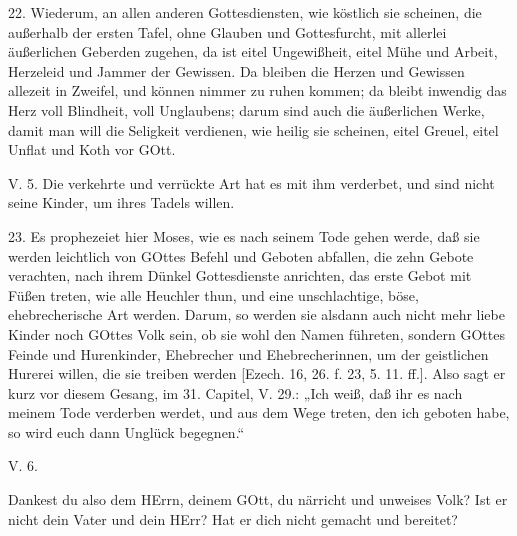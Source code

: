 22. Wiederum, an allen anderen Gottesdiensten, wie köstlich sie scheinen, die außerhalb der ersten Tafel, ohne Glauben und Gottesfurcht, mit allerlei äußerlichen Geberden zugehen, da ist eitel Ungewißheit, eitel Mühe und Arbeit, Herzeleid und Jammer der Gewissen. Da bleiben die Herzen und Gewissen allezeit in Zweifel, und können nimmer zu ruhen kommen; da bleibt inwendig das Herz voll Blindheit, voll Unglaubens; darum sind auch die äußerlichen Werke, damit man will die Seligkeit verdienen, wie heilig sie scheinen, eitel Greuel, eitel Unflat und Koth vor GOtt.

\begin{schriftzitat}
V. 5. Die verkehrte und verrückte Art hat es mit ihm verderbet, und sind nicht seine Kinder, um ihres Tadels willen.
\end{schriftzitat}

23. Es prophezeiet hier Moses, wie es nach seinem Tode gehen werde, daß sie werden leichtlich von GOttes Befehl und Geboten abfallen, die zehn Gebote verachten, nach ihrem Dünkel Gottesdienste anrichten, das erste Gebot mit Füßen treten, wie alle Heuchler thun, und eine unschlachtige, böse, ehebrecherische Art werden. Darum, so werden sie alsdann auch nicht mehr liebe Kinder noch GOttes Volk sein, ob sie wohl den Namen führeten, sondern GOttes Feinde und Hurenkinder, Ehebrecher und Ehebrecherinnen, um der geistlichen Hurerei willen, die sie treiben werden [Ezech. 16, 26. f. 23, 5. 11. ff.]. Also sagt er kurz vor diesem Gesang, im 31. Capitel, V. 29.: „Ich weiß, daß ihr es nach meinem Tode verderben werdet, und aus dem Wege treten, den ich geboten habe, so wird euch dann Unglück begegnen.“

\begin{schriftzitat}
V. 6.
\end{schriftzitat}

Dankest du also dem HErrn, deinem GOtt, du närricht und unweises Volk? Ist er nicht dein Vater und dein HErr? Hat er dich nicht gemacht und bereitet?

